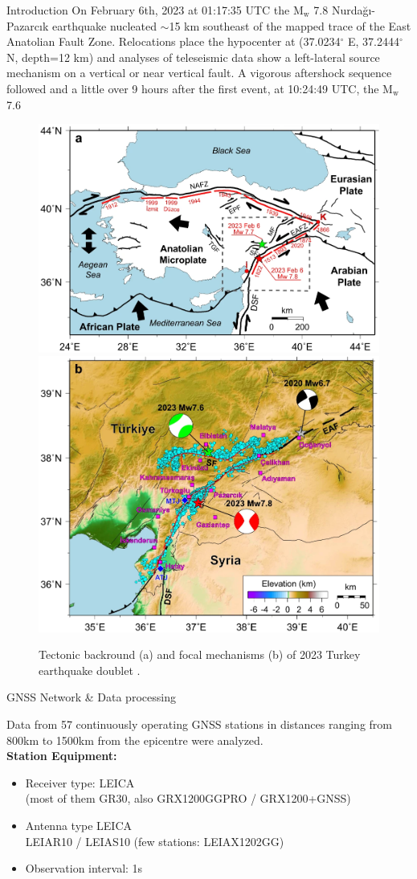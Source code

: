 \documentclass[final,a0,portrait]{beamer}
\newlength{\onecolwid}
\begin{document}
\begin{frame}[t]
\begin{columns}[t]
\begin{column}{\onecolwid}
\begin{block}{Introduction}
{\small
On February 6th, 2023 at 01:17:35 UTC the M$_\text{w}$ 7.8 Nurdağı-Pazarcık earthquake nucleated $\sim$15 km southeast of the mapped trace of the East Anatolian Fault Zone. Relocations  place the hypocenter at (37.0234$^{\circ}$ E, 37.2444$^{\circ}$ N, depth=12 km) and analyses of teleseismic data show a left-lateral source mechanism on a vertical or near vertical fault. A vigorous aftershock sequence followed and a little over 9 hours after the first event, at 10:24:49 UTC, the M$_\text{w}$ 7.6 \cite{Melgar_2023}
}
\begin{figure}
\begin{center}
  \includegraphics[width=.54\textwidth]{figures/eqturk23_tect.png}
  \includegraphics[width=.44\textwidth]{figures/eqturk23_fm.png}
\end{center}
    \caption{Tectonic backround (a) and focal mechanisms (b) of 2023 Turkey earthquake doublet \cite{Liu_2023}.}
    \label{fig:proc-net}
\end{figure} 
\end{block}

\vspace*{-1.5cm}
\begin{block}{GNSS Network \& Data processing}
{\small
Data from 57 continuously operating GNSS stations in distances ranging from 800km to 1500km from the epicentre were analyzed.\\
\textbf{Station Equipment:}
\begin{itemize}\setlength\itemsep{.3em}
  \item Receiver type: LEICA\\
    (most of them GR30, also GRX1200GGPRO / GRX1200+GNSS)
  \item Antenna type LEICA\\
    LEIAR10 / LEIAS10 (few stations: LEIAX1202GG)
  \item Observation interval: 1s
\end{itemize}

}
\end{block}
\end{column}
\end{columns}
\end{frame}
\end{document}
